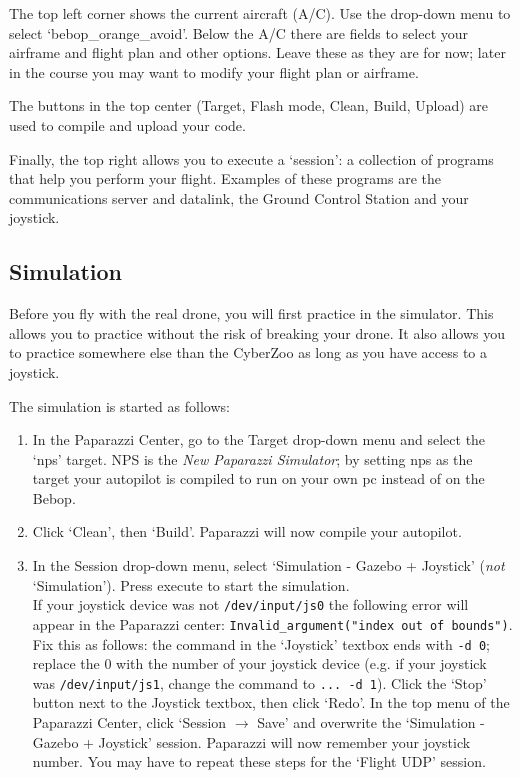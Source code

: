 \documentclass{article}
\begin{document}
The top left corner shows the current aircraft (A/C). Use the drop-down menu to select `bebop\_orange\_avoid'.
Below the A/C there are fields to select your airframe and flight plan and other options. Leave these as they are for now; later in the course you may want to modify your flight plan or airframe.

The buttons in the top center (Target, Flash mode, Clean, Build, Upload) are used to compile and upload your code.

Finally, the top right allows you to execute a `session': a collection of programs that help you perform your flight. Examples of these programs are the communications server and datalink, the Ground Control Station and your joystick.



\subsection*{Simulation}
Before you fly with the real drone, you will first practice in the simulator.
This allows you to practice without the risk of breaking your drone. It also allows you to practice somewhere else than the CyberZoo as long as you have access to a joystick.

\medskip
The simulation is started as follows:
\begin{enumerate}
\item In the Paparazzi Center, go to the Target drop-down menu and select the `nps' target. NPS is the \emph{New Paparazzi Simulator}; by setting nps as the target your autopilot is compiled to run on your own pc instead of on the Bebop.
\item Click `Clean', then `Build'. Paparazzi will now compile your autopilot.
\item In the Session drop-down menu, select `Simulation - Gazebo + Joystick' (\emph{not} `Simulation'). Press execute to start the simulation.\smallskip\\
If your joystick device was not \verb"/dev/input/js0" the following error will appear in the Paparazzi center: \verb|Invalid_argument("index out of bounds")|. Fix this as follows: the command in the `Joystick' textbox ends with \verb"-d 0"; replace the 0 with the number of your joystick device (e.g. if your joystick was \verb"/dev/input/js1", change the command to \verb"... -d 1"). Click the `Stop' button next to the Joystick textbox, then click `Redo'. In the top menu of the Paparazzi Center, click `Session $\rightarrow$ Save' and overwrite the `Simulation - Gazebo + Joystick' session. Paparazzi will now remember your joystick number. You may have to repeat these steps for the `Flight UDP' session.
\end{enumerate}
\end{document}
